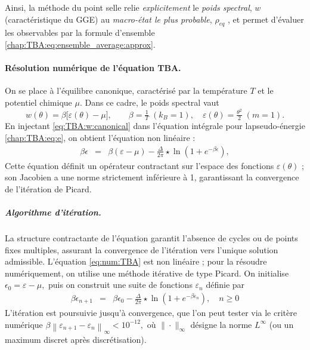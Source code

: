 \medskip
Ainsi, la méthode du point selle relie \emph{explicitement} le {\em poids spectral}, $w$  (caractéristique du GGE) au \emph{macro-état le plus probable}, $\rho_{eq}$ , et permet d’évaluer les observables par la formule d’ensemble \eqref{chap:TBA:eq:ensemble_average:approx}.


\paragraph{Résolution numérique de l’équation TBA.}\label{para-algho-TBA}

On se place à l’équilibre canonique, caractérisé par la température \( T \) et le potentiel chimique \( \mu \).  Dans ce cadre, le poids spectral vaut
\begin{equation}
  w(\theta)=\beta\bigl[\varepsilon(\theta)-\mu\bigr],\qquad\beta=\tfrac1T\; (k_B = 1 ),\quad\varepsilon(\theta)=\tfrac{\theta^{2}}{2}\;(m=1).\label{eq:TBA:w:canonical}
\end{equation}
En injectant \eqref{eq:TBA:w:canonical} dans l’équation intégrale pour lapseudo-énergie \eqref{chap:TBA:eq:e}, on obtient l’équation non linéaire :
\begin{eqnarray*}
	\beta \epsilon & = & \beta (\varepsilon - \mu)  -  \frac{\Delta}{2\pi} \star \ln \left( 1 + e^{-\beta \epsilon} \right) ,\label{eq:num:TBA}
\end{eqnarray*}
Cette équation définit un opérateur contractant sur l’espace des fonctions
\( \varepsilon(\theta) \) ; son Jacobien a une norme strictement
inférieure à 1, garantissant la convergence de l’itération de Picard.

\medskip
\subparagraph{Algorithme d’itération.}  
La structure contractante de l’équation garantit l’absence de cycles ou de points fixes multiples, assurant la convergence de l’itération vers l’unique solution admissible.
L’équation \eqref{eq:num:TBA} est non linéaire ; pour la résoudre numériquement, on utilise une méthode itérative de type Picard. On initialise
\(
  \epsilon_0 = \varepsilon - \mu,
\)
puis on construit une suite de fonctions \(\varepsilon_n\) définie par
\begin{eqnarray*}
	\beta \epsilon_{n+1} & = & \beta \epsilon_0 -   \frac{\Delta}{2\pi} \star \ln \left( 1 + e^{-\beta \epsilon_n} \right) ,\quad n\ge0
\end{eqnarray*}
L’itération est poursuivie jusqu’à convergence, que l’on peut tester via le critère numérique
\(
  \beta \left\| \varepsilon_{n+1} - \varepsilon_n \right\|_\infty < 10^{-12},
\)
où \(\|\cdot\|_\infty\) désigne la norme \(L^\infty\) (ou un maximum discret après discrétisation).


